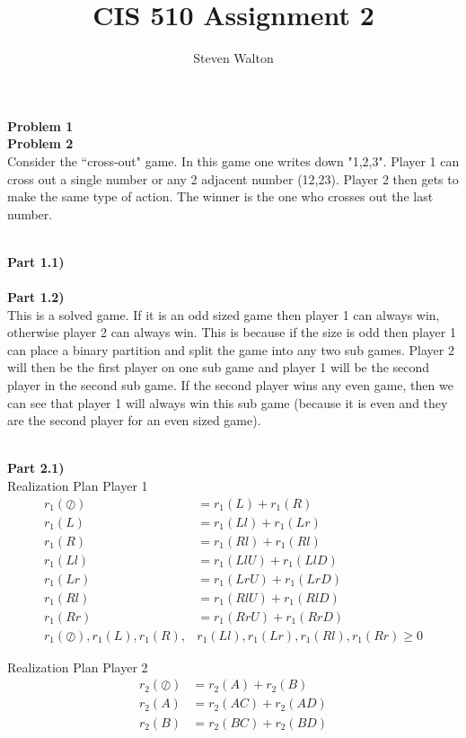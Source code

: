 \documentclass[12pt,letter]{article}
\newcommand{\problem}[1]{\vspace{3mm}\Large\textbf{{Problem {#1}\vspace{3mm}}}\normalsize\\}
\newcommand{\ppart}[1]{\vspace{2mm}\large\textbf{\\Part {#1})\vspace{2mm}}\normalsize\\}
\begin{document}
\title{CIS 510 Assignment 2}
\author{Steven Walton}
\maketitle
\problem{1}
\problem{2}
Consider the ``cross-out" game. In this game one writes down "1,2,3". Player
1 can cross out a single number or any 2 adjacent number (12,23). Player
2 then gets to make the same type of action. The winner is the one who crosses
out the last number.

\ppart{1.1}
\ppart{1.2}
This is a solved game. If it is an odd sized game then player 1 can always win,
otherwise player 2 can always win. This is because if the size is odd then 
player 1 can place a binary partition and split the game into any two sub games.
Player 2 will then be the first player on one sub game and player 1 will be the
second player in the second sub game. If the second player wins any even game,
then we can see that player 1 will always win this sub game (because it is even
and they are the second player for an even sized game). 

\ppart{2.1}
Realization Plan Player 1
\begin{align*}
    r_1(\oslash) &= r_1(L) + r_1(R) \\
    r_1(L) &= r_1(Ll) + r_1(Lr)\\
    r_1(R) &= r_1(Rl) + r_1(Rl)\\
    r_1(Ll) &= r_1(LlU) + r_1(LlD)\\
    r_1(Lr) &= r_1(LrU) + r_1(LrD)\\
    r_1(Rl) &= r_1(RlU) + r_1(RlD)\\
    r_1(Rr) &= r_1(RrU) + r_1(RrD)\\
    r_1(\oslash),r_1(L),r_1(R),&r_1(Ll),r_1(Lr),r_1(Rl),r_1(Rr) \geq 0
\end{align*}

Realization Plan Player 2
\begin{align*}
    r_2(\oslash) &= r_2(A) + r_2(B)\\
    r_2(A) &= r_2(AC) + r_2(AD)\\
    r_2(B) &= r_2(BC) + r_2(BD)\\
\end{align*}
\end{document}
